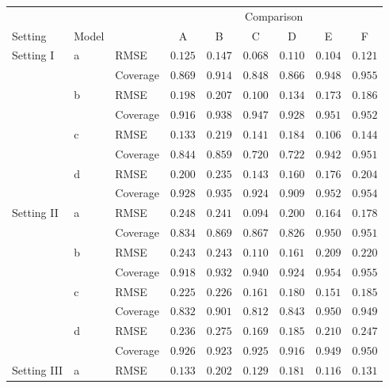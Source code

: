 \begin{tabular}{lllcccccc}
\hline
& & & \multicolumn{6}{c}{Comparison} \\ 
Setting & Model &  & A & B & C & D & E & \multicolumn{1}{c}{F} \\ 
\hline
\nopagebreak Setting I & \nopagebreak a & RMSE  & $0.125$ & $0.147$ & $0.068$ & $0.110$ & $0.104$ & $0.121$ \\
 &  & Coverage  & $0.869$ & $0.914$ & $0.848$ & $0.866$ & $0.948$ & $0.955$ \\
 & \rule{0pt}{1.7\normalbaselineskip}b & RMSE  & $0.198$ & $0.207$ & $0.100$ & $0.134$ & $0.173$ & $0.186$ \\
 &  & Coverage  & $0.916$ & $0.938$ & $0.947$ & $0.928$ & $0.951$ & $0.952$ \\
 & \rule{0pt}{1.7\normalbaselineskip}c & RMSE  & $0.133$ & $0.219$ & $0.141$ & $0.184$ & $0.106$ & $0.144$ \\
 &  & Coverage  & $0.844$ & $0.859$ & $0.720$ & $0.722$ & $0.942$ & $0.951$ \\
 & \rule{0pt}{1.7\normalbaselineskip}d & RMSE  & $0.200$ & $0.235$ & $0.143$ & $0.160$ & $0.176$ & $0.204$ \\
 &  & Coverage  & $0.928$ & $0.935$ & $0.924$ & $0.909$ & $0.952$ & $0.954$ \\
\rule{0pt}{1.7\normalbaselineskip}Setting II & \nopagebreak a & RMSE  & $0.248$ & $0.241$ & $0.094$ & $0.200$ & $0.164$ & $0.178$ \\
 &  & Coverage  & $0.834$ & $0.869$ & $0.867$ & $0.826$ & $0.950$ & $0.951$ \\
 & \rule{0pt}{1.7\normalbaselineskip}b & RMSE  & $0.243$ & $0.243$ & $0.110$ & $0.161$ & $0.209$ & $0.220$ \\
 &  & Coverage  & $0.918$ & $0.932$ & $0.940$ & $0.924$ & $0.954$ & $0.955$ \\
 & \rule{0pt}{1.7\normalbaselineskip}c & RMSE  & $0.225$ & $0.226$ & $0.161$ & $0.180$ & $0.151$ & $0.185$ \\
 &  & Coverage  & $0.832$ & $0.901$ & $0.812$ & $0.843$ & $0.950$ & $0.949$ \\
 & \rule{0pt}{1.7\normalbaselineskip}d & RMSE  & $0.236$ & $0.275$ & $0.169$ & $0.185$ & $0.210$ & $0.247$ \\
 &  & Coverage  & $0.926$ & $0.923$ & $0.925$ & $0.916$ & $0.949$ & $0.950$ \\
\rule{0pt}{1.7\normalbaselineskip}Setting III & \nopagebreak a & RMSE  & $0.133$ & $0.202$ & $0.129$ & $0.181$ & $0.116$ & $0.131$ \\

\end{tabular}
